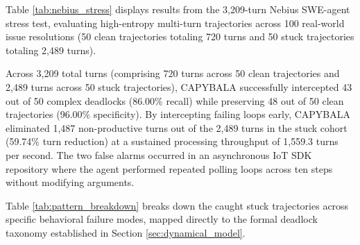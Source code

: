 \documentclass[journal]{IEEEtran}
\begin{document}
Table \ref{tab:nebius_stress} displays results from the 3,209-turn Nebius SWE-agent stress test, evaluating high-entropy multi-turn trajectories across 100 real-world issue resolutions (50 clean trajectories totaling 720 turns and 50 stuck trajectories totaling 2,489 turns).

\begin{table}[!t]
\caption{Large-Scale Stress Test on Nebius SWE-agent Corpus (3,209 Total Turns Across 100 Trajectories)}
\label{tab:nebius_stress}
\centering
{}
\end{table}

Across 3,209 total turns (comprising 720 turns across 50 clean trajectories and 2,489 turns across 50 stuck trajectories), CAPYBALA successfully intercepted 43 out of 50 complex deadlocks (86.00\% recall) while preserving 48 out of 50 clean trajectories (96.00\% specificity). By intercepting failing loops early, CAPYBALA eliminated 1,487 non-productive turns out of the 2,489 turns in the stuck cohort (59.74\% turn reduction) at a sustained processing throughput of 1,559.3 turns per second. The two false alarms occurred in an asynchronous IoT SDK repository where the agent performed repeated polling loops across ten steps without modifying arguments.

Table \ref{tab:pattern_breakdown} breaks down the caught stuck trajectories across specific behavioral failure modes, mapped directly to the formal deadlock taxonomy established in Section \ref{sec:dynamical_model}.
\end{document}

